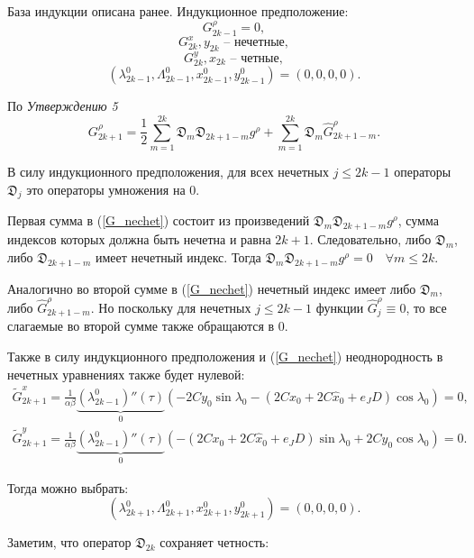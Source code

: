 База индукции описана ранее.
Индукционное предположение:
$$G_{2k-1}^\rho = 0,$$
$$G_{2k}^x, y_{2k} \text{ -- нечетные},$$
$$G_{2k}^y, x_{2k} \text{ -- четные},$$
$$({\lambda^0_{2k-1}, \Lambda^0_{2k-1}, x^0_{2k-1}, y^0_{2k-1}}) = (0,0,0,0).$$

По \textit{Утверждению 5} 
\begin{equation}
G_{2k+1}^\rho = \frac12 \sum_{m=1}^{2k} \mathfrak{D}_m \mathfrak{D}_{2k+1-m} g^\rho + \sum_{m=1}^{2k} \mathfrak{D}_m \hat G_{2k+1-m}^\rho.
\label{G_nechet}
\end{equation}

В силу индукционного предположения, для всех нечетных $j \leq 2k-1$ операторы $\mathfrak{D}_{j}$ это операторы умножения на $0$.

Первая сумма в (\ref{G_nechet}) состоит из произведений $\mathfrak{D}_m \mathfrak{D}_{2k+1-m} g^\rho$, сумма индексов которых должна быть нечетна и равна $2k+1$. Следовательно, либо $\mathfrak{D}_m$, либо $\mathfrak{D}_{2k+1-m}$ имеет нечетный индекс.  
Тогда $\mathfrak{D}_m \mathfrak{D}_{2k+1-m} g^\rho = 0 \quad \forall m \leq 2k$.

Аналогично во второй сумме в (\ref{G_nechet}) нечетный индекс имеет либо $\mathfrak{D}_m$, либо $\hat G^\rho_{2k+1-m}$. Но поскольку для нечетных $j \le 2k-1$ функции $\hat G^\rho_{j} \equiv 0$, то все слагаемые во второй сумме также обращаются в 0. 

Также в силу индукционного предположения и (\ref{G_nechet}) неоднородность в нечетных уравнениях также будет нулевой:
\begin{equation*}
\begin{aligned}
\tilde G_{2k+1}^x  = \frac{1}{\alpha \beta} \underbrace{(\lambda^0_{2k-1})''(\tau)}_0 \left( -2Cy_0 \sin\lambda_0 - (2Cx_0+2C \hat x_0+e_JD) \cos\lambda_0 \right) =0,
\end{aligned}
\end{equation*}
\begin{equation*}
\begin{aligned}
\tilde G_{2k+1}^y  = \frac{1}{\alpha \beta} \underbrace{(\lambda^0_{2k-1})''(\tau)}_0 \left( -(2Cx_0+2C \hat x_0+e_JD) \sin\lambda_0 + 2Cy_0 \cos\lambda_0 \right) = 0.
\end{aligned}
\end{equation*}

Тогда можно выбрать:
$$({\lambda^0_{2k+1}, \Lambda^0_{2k+1}, x^0_{2k+1}, y^0_{2k+1}}) = (0,0,0,0).$$

Заметим, что оператор $\mathfrak{D}_{2k}$ сохраняет четность:

